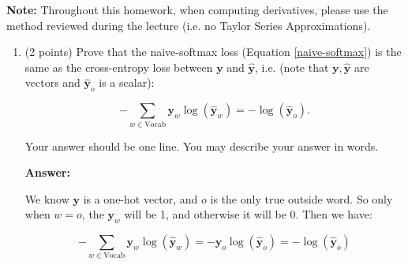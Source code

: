 \documentclass{article}
\newenvironment{answer}{
    {\bf Answer:} \sf \begingroup\color{red}
}{\endgroup}%
\begin{document}
\textbf{Note:} Throughout this homework, when computing derivatives, please use the method reviewed during the lecture (i.e. no Taylor Series Approximations).

\clearpage 
\begin{enumerate}[label=(\alph*)]
\item (2 points) 
Prove that the naive-softmax loss (Equation \ref{naive-softmax}) is the same as the cross-entropy loss between $\bm y$ and $\hat{\bm y}$, i.e. (note that $\bm y, \hat{\bm y}$ are vectors and $\hat{\bm y}_o$ is a scalar):

\begin{equation} 
-\sum_{w \in \text{Vocab}} \bm y_w \log(\hat{\bm y}_w) = - \log (\hat{\bm y}_o).
\end{equation}

Your answer should be one line. You may describe your answer in words.
\begin{shaded}
\begin{answer} 
We know $\bm y$ is a one-hot vector, and $o$ is the only true outside word. So only when $w = o$, the $\bm y_w$ will be 1, and otherwise it will be 0. Then we have:

\[- \sum_{w \in \text{Vocab}} \bm y_w \log(\hat{\bm y}_w) = - \bm y_o \log(\hat{\bm y}_o) = - \log (\hat{\bm y}_o)\]
\end{answer}
\end{shaded}


\end{enumerate}
\end{document}
